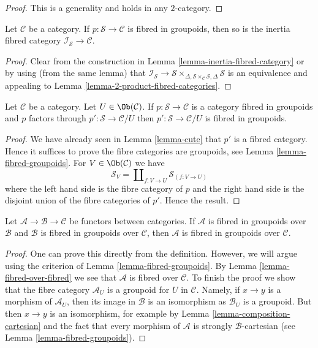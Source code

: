 \begin{proof}
This is a generality and holds in any $2$-category.
\end{proof}

\begin{lemma}
\label{lemma-inertia-fibred-groupoids}
Let $\mathcal{C}$ be a category.
If $p : \mathcal{S} \to \mathcal{C}$ is fibred in groupoids, then
so is the inertia fibred category $\mathcal{I}_\mathcal{S} \to \mathcal{C}$.
\end{lemma}

\begin{proof}
Clear from the construction in
Lemma \ref{lemma-inertia-fibred-category}
or by using (from the same lemma) that
$\mathcal{I}_\mathcal{S} \to \mathcal{S}
\times_{\Delta, \mathcal{S} \times_\mathcal{C} \mathcal{S}, \Delta}\mathcal{S}$
is an equivalence and appealing to
Lemma \ref{lemma-2-product-fibred-categories}.
\end{proof}

\begin{lemma}
\label{lemma-cute-groupoids}
Let $\mathcal{C}$ be a category. Let $U \in \Ob(\mathcal{C})$.
If $p : \mathcal{S} \to \mathcal{C}$ is a category fibred in groupoids
and $p$ factors through $p' : \mathcal{S} \to \mathcal{C}/U$
then $p' : \mathcal{S} \to \mathcal{C}/U$ is fibred in groupoids.
\end{lemma}

\begin{proof}
We have already seen in Lemma \ref{lemma-cute} that $p'$ is a fibred
category. Hence it suffices to prove the fibre categories are groupoids,
see Lemma \ref{lemma-fibred-groupoids}.
For $V \in \Ob(\mathcal{C})$ we have
$$
\mathcal{S}_V = \coprod\nolimits_{f : V \to U} \mathcal{S}_{(f : V \to U)}
$$
where the left hand side is the fibre category of $p$ and the right hand side
is the disjoint union of the fibre categories of $p'$.
Hence the result.
\end{proof}

\begin{lemma}
\label{lemma-fibred-in-groupoids-over-fibred-in-groupoids}
Let $\mathcal{A} \to \mathcal{B} \to \mathcal{C}$ be functors between
categories. If $\mathcal{A}$ is fibred in groupoids over $\mathcal{B}$
and $\mathcal{B}$ is fibred in groupoids over $\mathcal{C}$, then
$\mathcal{A}$ is fibred in groupoids over $\mathcal{C}$.
\end{lemma}

\begin{proof}
One can prove this directly from the definition. However, we will argue
using the criterion of Lemma \ref{lemma-fibred-groupoids}.
By Lemma \ref{lemma-fibred-over-fibred} we see that $\mathcal{A}$
is fibred over $\mathcal{C}$. To finish the proof we show that the fibre
category $\mathcal{A}_U$ is a groupoid for $U$ in $\mathcal{C}$.
Namely, if $x \to y$ is a morphism of $\mathcal{A}_U$, then its
image in $\mathcal{B}$ is an isomorphism as $\mathcal{B}_U$ is
a groupoid. But then $x \to y$ is an isomorphism, for example by
Lemma \ref{lemma-composition-cartesian} and the fact that every
morphism of $\mathcal{A}$ is strongly $\mathcal{B}$-cartesian
(see Lemma \ref{lemma-fibred-groupoids}).
\end{proof}

